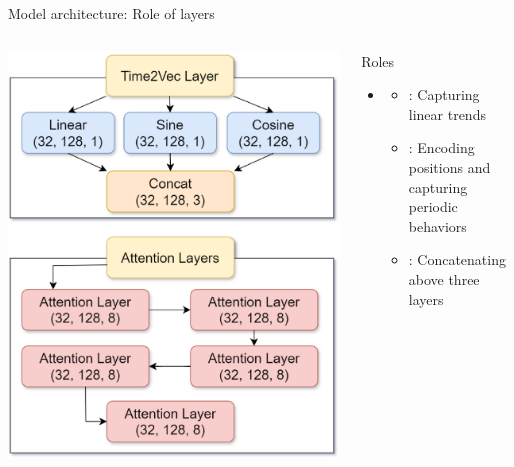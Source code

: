 \documentclass[compress, mathserif, fleqn, 10pt]{beamer}
\begin{document}
	\begin{frame}{Model architecture: Role of layers}
		\begin{columns}
			\begin{column}{0.45\textwidth}
				\centerline{\includegraphics[width=\textwidth]{images/model-parts.eps}}
			\end{column}
			\begin{column}{0.55\textwidth}
				\begin{block}{Roles}
					\begin{itemize}
						\item {}
						\begin{itemize}
							\item {}: Capturing linear trends
							\smallskip
							
							\item {}: Encoding positions and capturing
							periodic behaviors
							\smallskip
							
							\item {}: Concatenating above three layers
						\end{itemize}
						\bigskip
						

\end{itemize}
\end{block}
\end{column}
\end{columns}
\end{frame}
\end{document}
